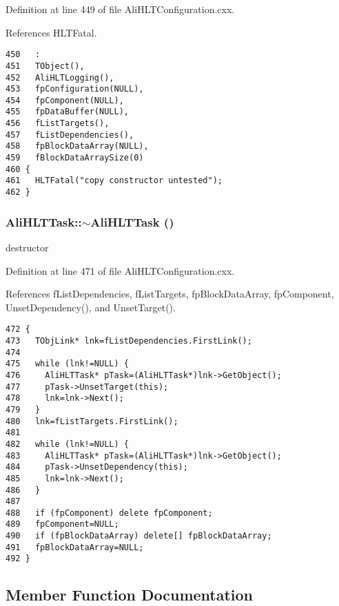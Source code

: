 Definition at line 449 of file Ali\-HLTConfiguration.cxx.

References HLTFatal.

\footnotesize\begin{verbatim}450   :
451   TObject(),
452   AliHLTLogging(),
453   fpConfiguration(NULL),
454   fpComponent(NULL),
455   fpDataBuffer(NULL),
456   fListTargets(),
457   fListDependencies(),
458   fpBlockDataArray(NULL),
459   fBlockDataArraySize(0)
460 {
461   HLTFatal("copy constructor untested");
462 }

\end{verbatim}\normalsize 


\subsubsection{\setlength{\rightskip}{0pt plus 5cm}Ali\-HLTTask::$\sim${\bf Ali\-HLTTask} ()\hspace{0.3cm}{\tt  [virtual]}}\label{classAliHLTTask_a4}


destructor 

Definition at line 471 of file Ali\-HLTConfiguration.cxx.

References f\-List\-Dependencies, f\-List\-Targets, fp\-Block\-Data\-Array, fp\-Component, Unset\-Dependency(), and Unset\-Target().

\footnotesize\begin{verbatim}472 {
473   TObjLink* lnk=fListDependencies.FirstLink();
474 
475   while (lnk!=NULL) {
476     AliHLTTask* pTask=(AliHLTTask*)lnk->GetObject();
477     pTask->UnsetTarget(this);
478     lnk=lnk->Next();
479   }
480   lnk=fListTargets.FirstLink();
481 
482   while (lnk!=NULL) {
483     AliHLTTask* pTask=(AliHLTTask*)lnk->GetObject();
484     pTask->UnsetDependency(this);
485     lnk=lnk->Next();
486   }
487 
488   if (fpComponent) delete fpComponent;
489   fpComponent=NULL;
490   if (fpBlockDataArray) delete[] fpBlockDataArray;
491   fpBlockDataArray=NULL;
492 }
\end{verbatim}\normalsize 




\subsection{Member Function Documentation}
